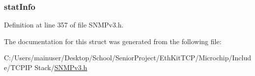 \hypertarget{struct_msg_proc_mod_prepare_response_message_ad07540e94950d793173ffdb63915b853}{}
\subsubsection[{stat\+Info}]{ stat\+Info}\label{struct_msg_proc_mod_prepare_response_message_ad07540e94950d793173ffdb63915b853}


Definition at line 357 of file S\+N\+M\+Pv3.\+h.



The documentation for this struct was generated from the following file\+:\begin{DoxyCompactItemize}
\item 
C\+:/\+Users/mainuser/\+Desktop/\+School/\+Senior\+Project/\+Eth\+Kit\+T\+C\+P/\+Microchip/\+Include/\+T\+C\+P\+I\+P Stack/\hyperlink{_s_n_m_pv3_8h}{S\+N\+M\+Pv3.\+h}\end{DoxyCompactItemize}
